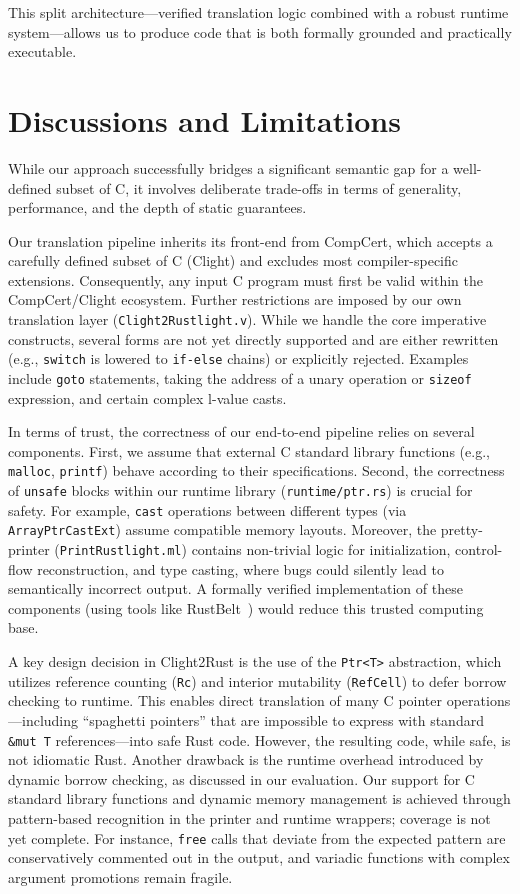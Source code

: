 \documentclass{llncs} %
\begin{document}
This split architecture—verified translation logic combined with a robust runtime system—allows us to produce code that is both formally grounded and practically executable.


\section{Discussions and Limitations}
\label{app:limitations}

While our approach successfully bridges a significant semantic gap for a well-defined subset of C, it involves deliberate trade-offs in terms of generality, performance, and the depth of static guarantees.

Our translation pipeline inherits its front-end from CompCert, which accepts a carefully defined subset of C (Clight) and excludes most compiler-specific extensions. Consequently, any input C program must first be valid within the CompCert/Clight ecosystem. Further restrictions are imposed by our own translation layer (\texttt{Clight2Rustlight.v}). While we handle the core imperative constructs, several forms are not yet directly supported and are either rewritten (e.g., \texttt{switch} is lowered to \texttt{if-else} chains) or explicitly rejected. Examples include \texttt{goto} statements, taking the address of a unary operation or \texttt{sizeof} expression, and certain complex l-value casts.

In terms of trust, the correctness of our end-to-end pipeline relies on several components. First, we assume that external C standard library functions (e.g., \texttt{malloc}, \texttt{printf}) behave according to their specifications. Second, the correctness of \texttt{unsafe} blocks within our runtime library (\texttt{runtime/ptr.rs}) is crucial for safety. For example, \texttt{cast} operations between different types (via \texttt{ArrayPtrCastExt}) assume compatible memory layouts. Moreover, the pretty-printer (\texttt{PrintRustlight.ml}) contains non-trivial logic for initialization, control-flow reconstruction, and type casting, where bugs could silently lead to semantically incorrect output. A formally verified implementation of these components (using tools like RustBelt~\cite{Jung2017}) would reduce this trusted computing base.

A key design decision in Clight2Rust is the use of the \texttt{Ptr<T>} abstraction, which utilizes reference counting (\texttt{Rc}) and interior mutability (\texttt{RefCell}) to defer borrow checking to runtime. This enables direct translation of many C pointer operations---including ``spaghetti pointers'' that are impossible to express with standard \texttt{\&mut T} references---into safe Rust code. However, the resulting code, while safe, is not idiomatic Rust. Another drawback is the runtime overhead introduced by dynamic borrow checking, as discussed in our evaluation. Our support for C standard library functions and dynamic memory management is achieved through pattern-based recognition in the printer and runtime wrappers; coverage is not yet complete. For instance, \texttt{free} calls that deviate from the expected pattern are conservatively commented out in the output, and variadic functions with complex argument promotions remain fragile.
\end{document}
